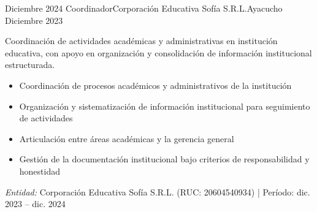 \experience
{Diciembre 2024} {Coordinador}{Corporación Educativa Sofía S.R.L.}{Ayacucho}
{Diciembre 2023} {
	Coordinación de actividades académicas y administrativas en institución educativa, con apoyo en organización y consolidación de información institucional estructurada.
	\begin{itemize}
		\item Coordinación de procesos académicos y administrativos de la institución
		\item Organización y sistematización de información institucional para seguimiento de actividades
		\item Articulación entre áreas académicas y la gerencia general
		\item Gestión de la documentación institucional bajo criterios de responsabilidad y honestidad
	\end{itemize}
}
{\footnotesize{\emph{Entidad:} Corporación Educativa Sofía S.R.L. (RUC: 20604540934) | Período: dic. 2023 -- dic. 2024}}
